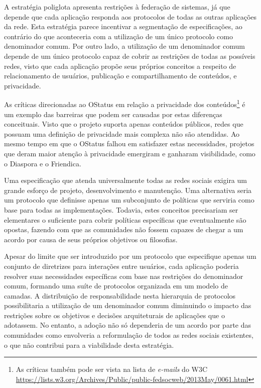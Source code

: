 A estratégia poliglota apresenta restrições à federação de sistemas, já que depende
que cada aplicação responda aos protocolos de todas as outras aplicações da rede.
Esta estratégia parece incentivar a segmentação de especificações, ao contrário do
que aconteceria com a utilização de um único protocolo como denominador comum. Por
outro lado, a utilização de um denominador comum depende de um único protocolo capaz
de cobrir as restrições de todas as possíveis redes, visto que cada aplicação propõe
seus próprios conceitos a respeito de relacionamento de usuários, publicação e
compartilhamento de conteúdos, e privacidade.

As críticas direcionadas ao OStatus em relação a privacidade dos
conteúdos\footnote{As críticas também pode ser vista na lista de \textit{e-mails} do
W3C \url{https://lists.w3.org/Archives/Public/public-fedsocweb/2013May/0061.html}} é
um exemplo das barreiras que podem ser causadas por estas diferenças conceituais.
Visto que o projeto suporta apenas conteúdos públicos, redes que possuam uma
definição de privacidade mais complexa não são atendidas. Ao mesmo tempo em que o
OStatus falhou em satisfazer estas necessidades, projetos que deram maior atenção à
privacidade emergiram e ganharam visibilidade, como o Diaspora e o Friendica.


Uma especificação que atenda universalmente todas as redes sociais exigira um grande
esforço de projeto, desenvolvimento e manutenção. Uma alternativa seria um protocolo
que definisse apenas um subconjunto de políticas que serviria como base para todas
as implementações. Todavia, estes conceitos precisariam ser elementares o suficiente
para cobrir políticas específicas que eventualmente são opostas, fazendo com que as
comunidades não fossem capazes de chegar a um acordo por causa de seus próprios
objetivos ou filosofias.

Apesar do limite que ser introduzido por um protocolo que especifique apenas um
conjunto de diretrizes para interações entre usuários, cada aplicação poderia
resolver suas necessidades específicas com base nas restrições do denominador comum,
formando uma suíte de protocolos organizada em um modelo de camadas. A distribuição
de responsabilidade nesta hierarquia de protocolos possibilitaria a utilização de um
denominador comum diminuindo o impacto das restrições sobre os objetivos e decisões
arquiteturais de aplicações que o adotassem. No entanto, a adoção não só dependeria
de um acordo por parte das comunidades como envolveria a reformulação de todos as
redes sociais existentes, o que não contribui para a viabilidade desta estratégia.


